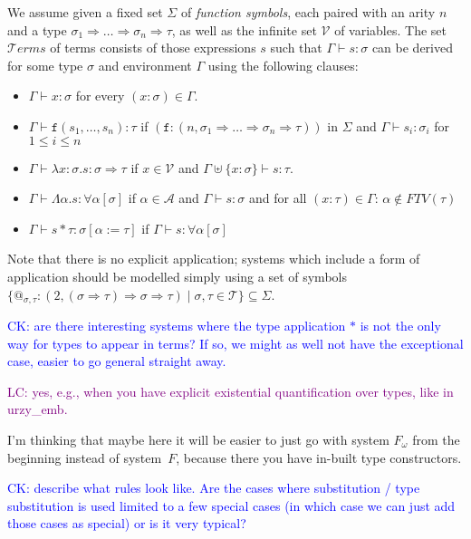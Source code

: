 \documentclass[runningheads,a4paper]{llncs}
\newcommand{\Typevars}{\mathcal{A}}
\newcommand{\Vars}{\mathcal{V}}
\newcommand{\Types}{\mathcal{T}}
\newcommand{\Terms}{\mathcal{T}\!\mathit{erms}}
\newcommand{\quant}[2]{\forall #1[#2]}
\newcommand{\arrtype}{\Rightarrow}
\newcommand{\abs}[2]{\lambda #1.#2}
\newcommand{\tabs}[2]{\Lambda #1.#2}
\newcommand{\tapp}[2]{#1 * #2}
\newcommand{\subst}[2]{#1:=#2}
\newcommand{\FTV}{\mathit{FTV}}
\newcommand{\CK}[1]{\textcolor{blue}{CK: #1}}
\newcommand{\LC}[1]{\textcolor{purple}{LC: #1}}
\begin{document}
\begin{definition}
We assume given a fixed set $\Sigma$ of \emph{function symbols}, each
paired with an arity $n$ and a type $\sigma_1 \arrtype \dots \arrtype
\sigma_n \arrtype \tau$, as well as the infinite set $\Vars$ of variables.
The set $\Terms$ of terms consists of those expressions $s$ such that
$\Gamma \vdash s : \sigma$ can be derived for some type $\sigma$ and
environment $\Gamma$ using the following clauses:
\begin{itemize}
\item $\Gamma \vdash x : \sigma$ for every $(x : \sigma) \in \Gamma$.
\item $\Gamma \vdash \mathtt{f}(s_1,\dots,s_n) : \tau$ if
  $(\mathtt{f} : (n,\sigma_1 \arrtype \dots \arrtype \sigma_n \arrtype
  \tau))$ in $\Sigma$ and $\Gamma \vdash s_i : \sigma_i$ for $1 \leq
  i \leq n$
\item $\Gamma \vdash \abs{x:\sigma}{s} : \sigma \arrtype \tau$ if $x
  \in \Vars$ and $\Gamma \uplus \{ x : \sigma \} \vdash s : \tau$.
\item $\Gamma \vdash \tabs{\alpha}{s} : \quant{\alpha}{\sigma}$ if
  $\alpha \in \Typevars$ and $\Gamma \vdash s : \sigma$ and for all
  $(x : \tau) \in \Gamma$: $\alpha \notin \FTV(\tau)$
\item $\Gamma \vdash \tapp{s}{\tau} : \sigma[\subst{\alpha}{\tau}]$ if
  $\Gamma \vdash s : \quant{\alpha}{\sigma}$
\end{itemize}
\end{definition}

Note that there is no explicit application; systems which include a form
of application should be modelled simply using a set of symbols $\{
@_{\sigma,\tau}: (2,(\sigma \arrtype \tau) \arrtype \sigma \arrtype \tau)
\mid \sigma,\tau \in \Types \} \subseteq \Sigma$.

\CK{are there interesting systems where the type application $*$ is
not the only way for types to appear in terms?  If so, we might as well
not have the exceptional case, easier to go general straight away.}

\LC{yes, e.g., when you have explicit existential quantification over
types, like in urzy\_emb.}

I'm thinking that maybe here it will be easier to just go with
system $F_\omega$ from the beginning instead of system~$F$, because
there you have in-built type constructors.

\CK{describe what rules look like.  Are the cases where substitution
/ type substitution is used limited to a few special cases (in which
case we can just add those cases as special) or is it very typical?}
\end{document}
